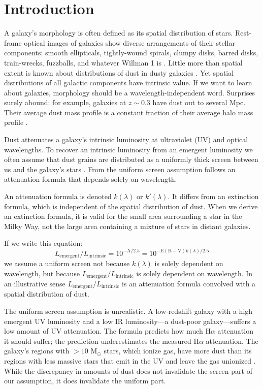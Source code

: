 \documentclass[preprint]{aastex}
\begin{document}
\section{Introduction}

A galaxy's morphology is often defined as its spatial distribution of stars.
Rest-frame optical images of galaxies show diverse arrangements of
their stellar components: smooth ellipticals, tightly-wound spirals, clumpy
disks, barred disks, train-wrecks, fuzzballs, and whatever Willman 1 is
\citep{willman05,willman11}.
Little more than spatial extent is known about distributions of dust in dusty
galaxies
\citep{younger10,diaz10,simpson15}.  Yet spatial distributions of
all galactic components have intrinsic value.  If we want to learn about
galaxies, morphology should be a wavelength-independent word.  Surprises
surely abound: for example, galaxies at $z \sim 0.3$ have dust out to several
Mpc.  Their average dust mass profile is a constant fraction of their average
halo mass profile \citep[][see also \citealt{zaritsky94}]{menard10}.

Dust attenuates a galaxy's intrinsic luminosity at ultraviolet (UV) and optical
wavelengths.  To recover an intrinsic luminosity from an emergent luminosity we
often assume that dust grains
are distributed as a uniformly thick screen between us and the galaxy's stars
\citep{calzetti94}.  From the uniform screen assumption follows an
attenuation formula that depends solely on wavelength.

An attenuation formula is denoted $k(\lambda)$ or $k'(\lambda)$.  It differs
from an extinction formula, which is independent of the spatial distribution
of dust.  When we derive an extinction formula, it is valid for the small area
surrounding a star in the Milky Way, not the large area containing a mixture of
stars in distant galaxies.

If we write this equation:
\begin{equation*}
L_{\mathrm{emergent}}/L_{\mathrm{intrinsic}} = 10^{-\mathrm{A}/2.5} = 10^{-\mathrm{E(B-V)} k(\lambda)/2.5}
\end{equation*}
we assume a uniform screen not because $k(\lambda)$ is solely dependent on
wavelength, but because $L_{\mathrm{emergent}}/L_{\mathrm{intrinsic}}$ is solely
dependent on
wavelength.  In an illustrative sense
$L_{\mathrm{emergent}}/L_{\mathrm{intrinsic}}$
is an attenuation formula convolved with a spatial distribution of dust.

The uniform screen assumption is unrealistic.  A low-redshift galaxy with a
high emergent UV luminosity and a low IR luminosity---a dust-poor
galaxy---suffers a low amount of UV attenuation.  The \citet{calzetti00} formula
predicts how much H$\alpha$ attenuation it should suffer; the prediction
underestimates the measured H$\alpha$ attenuation.  The galaxy's regions with
$>10$ M$_{\odot}$ stars, which ionize gas, have more dust than its regions
with less massive stars that emit in the UV and leave the gas unionized
\citep{calzetti94,calzetti97b}.  While the discrepancy in amounts of dust does
not invalidate the screen part of our assumption, it does invalidate the
uniform part.
\end{document}
